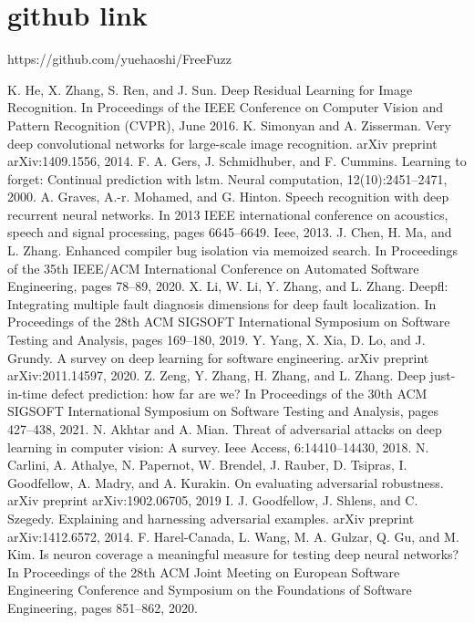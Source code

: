 \documentclass[sigconf]{acmart}
\begin{document}
\section{github link}
https://github.com/yuehaoshi/FreeFuzz
\begin{thebibliography}{9}
 K. He, X. Zhang, S. Ren, and J. Sun. Deep Residual Learning for Image Recognition.
In Proceedings of the IEEE Conference on Computer Vision and Pattern Recognition
(CVPR), June 2016.
 K. Simonyan and A. Zisserman. Very deep convolutional networks for large-scale
image recognition. arXiv preprint arXiv:1409.1556, 2014.
 F. A. Gers, J. Schmidhuber, and F. Cummins. Learning to forget: Continual
prediction with lstm. Neural computation, 12(10):2451–2471, 2000.
 A. Graves, A.-r. Mohamed, and G. Hinton. Speech recognition with deep recurrent
neural networks. In 2013 IEEE international conference on acoustics, speech and
signal processing, pages 6645–6649. Ieee, 2013.
 J. Chen, H. Ma, and L. Zhang. Enhanced compiler bug isolation via memoized
search. In Proceedings of the 35th IEEE/ACM International Conference on Automated
Software Engineering, pages 78–89, 2020.
 X. Li, W. Li, Y. Zhang, and L. Zhang. Deepfl: Integrating multiple fault diagnosis
dimensions for deep fault localization. In Proceedings of the 28th ACM SIGSOFT
International Symposium on Software Testing and Analysis, pages 169–180, 2019.
 Y. Yang, X. Xia, D. Lo, and J. Grundy. A survey on deep learning for software
engineering. arXiv preprint arXiv:2011.14597, 2020.
 Z. Zeng, Y. Zhang, H. Zhang, and L. Zhang. Deep just-in-time defect prediction:
how far are we? In Proceedings of the 30th ACM SIGSOFT International Symposium
on Software Testing and Analysis, pages 427–438, 2021.
 N. Akhtar and A. Mian. Threat of adversarial attacks on deep learning in computer
vision: A survey. Ieee Access, 6:14410–14430, 2018.
 N. Carlini, A. Athalye, N. Papernot, W. Brendel, J. Rauber, D. Tsipras, I. Goodfellow,
A. Madry, and A. Kurakin. On evaluating adversarial robustness. arXiv preprint
arXiv:1902.06705, 2019
 I. J. Goodfellow, J. Shlens, and C. Szegedy. Explaining and harnessing adversarial
examples. arXiv preprint arXiv:1412.6572, 2014.
 F. Harel-Canada, L. Wang, M. A. Gulzar, Q. Gu, and M. Kim. Is neuron coverage a
meaningful measure for testing deep neural networks? In Proceedings of the 28th
ACM Joint Meeting on European Software Engineering Conference and Symposium
on the Foundations of Software Engineering, pages 851–862, 2020.

\end{thebibliography}
\end{document}
